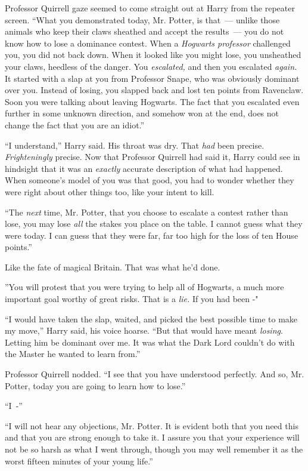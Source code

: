 Professor Quirrell gaze seemed to come straight out at Harry from the repeater screen. ``What you demonstrated today, Mr. Potter, is that~--- unlike those animals who keep their claws sheathed and accept the results~--- you do not know how to lose a dominance contest. When a \emph{Hogwarts professor} challenged you, you did not back down. When it looked like you might lose, you unsheathed your claws, heedless of the danger. You \emph{escalated,} and then you escalated \emph{again.} It started with a slap at you from Professor Snape, who was obviously dominant over you. Instead of losing, you slapped back and lost ten points from Ravenclaw. Soon you were talking about leaving Hogwarts. The fact that you escalated even further in some unknown direction, and somehow won at the end, does not change the fact that you are an idiot.''

``I understand,'' Harry said. His throat was dry. That \emph{had} been precise. \emph{Frighteningly} precise. Now that Professor Quirrell had said it, Harry could see in hindsight that it was an \emph{exactly} accurate description of what had happened. When someone's model of you was that good, you had to wonder whether they were right about other things too, like your intent to kill.

``The \emph{next} time, Mr. Potter, that you choose to escalate a contest rather than lose, you may lose \emph{all} the stakes you place on the table. I cannot guess what they were today. I can guess that they were far, far too high for the loss of ten House points.''

Like the fate of magical Britain. That was what he'd done.

''You will protest that you were trying to help all of Hogwarts, a much more important goal worthy of great risks. That is a \emph{lie.} If you had been -"

``I would have taken the slap, waited, and picked the best possible time to make my move,'' Harry said, his voice hoarse. ``But that would have meant \emph{losing}. Letting him be dominant over me. It was what the Dark Lord couldn't do with the Master he wanted to learn from.''

Professor Quirrell nodded. ``I see that you have understood perfectly. And so, Mr. Potter, today you are going to learn how to lose.''

``I~-''

``I will not hear any objections, Mr. Potter. It is evident both that you need this and that you are strong enough to take it. I assure you that your experience will not be so harsh as what I went through, though you may well remember it as the worst fifteen minutes of your young life.''

